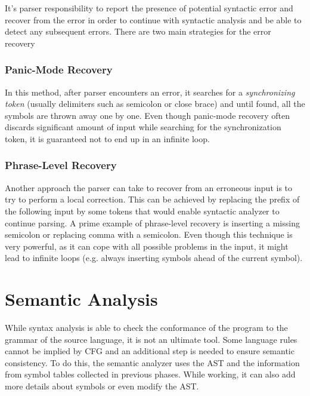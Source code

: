 \documentclass[
  digital, %
  table,   %
  lof,     %
  lot,     %
  oneside,
]{fithesis3}
\begin{document}
It's parser responsibility to report the presence of potential syntactic error and recover from the error in order to continue with syntactic analysis and be able to detect any subsequent errors. There are two main strategies for the error recovery~\cite{dragon-book}

  \subsubsection{Panic-Mode Recovery}
In this method, after parser encounters an error, it searches for a \textit{synchronizing token} (usually delimiters such as semicolon or close brace) and until found, all the symbols are thrown away one by one. Even though panic-mode recovery often discards significant amount of input while searching for the synchronization token, it is guaranteed not to end up in an infinite loop.

  \subsubsection{Phrase-Level Recovery}
Another approach the parser can take to recover from an erroneous input is to try to perform a local correction. This can be achieved by replacing the prefix of the following input by some tokens that would enable syntactic analyzer to continue parsing. A prime example of phrase-level recovery is inserting a missing semicolon or replacing comma with a semicolon. Even though this technique is very powerful, as it can cope with all possible problems in the input, it might lead to infinite loops (e.g. always inserting symbols ahead of the current symbol).

  \section{Semantic Analysis}
While syntax analysis is able to check the conformance of the program to the grammar of the source language, it is not an ultimate tool. Some language rules cannot be implied by CFG and an additional step is needed to ensure semantic consistency. To do this, the semantic analyzer uses the AST and the information from symbol tables collected in previous phases. While working, it can also add more details about symbols or even modify the AST. 
\end{document}
